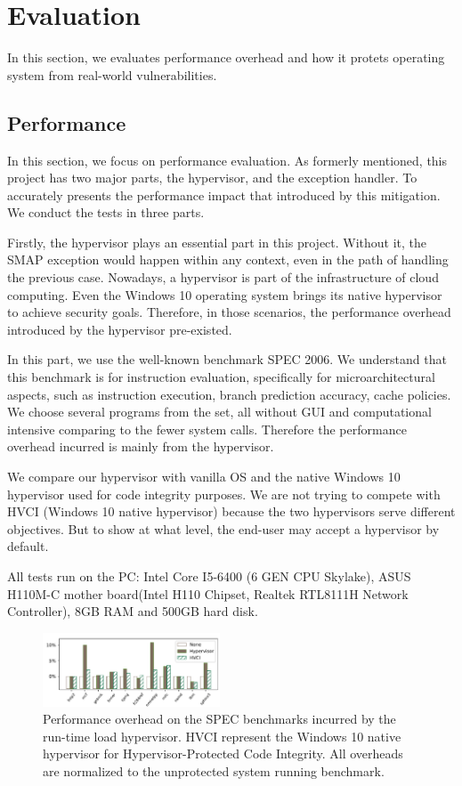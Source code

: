 
\section{Evaluation}
\label{sec:ktoctou-evaluation}

In this section, we evaluates performance overhead and how it protets  operating system from real-world vulnerabilities.

\subsection{Performance}
In this section, we focus on performance evaluation. 
As formerly mentioned, this project has two major parts, the hypervisor, and the exception handler. To accurately presents the performance impact that introduced by this mitigation. We conduct the tests in three parts.

Firstly, the hypervisor plays an essential part in this project. Without it, the SMAP exception would happen within any context, even in the path of handling the previous case. Nowadays, a hypervisor is part of the infrastructure of cloud computing. Even the Windows 10 operating system brings its native hypervisor to achieve security goals.  Therefore, in those scenarios,  the performance overhead introduced by the hypervisor pre-existed. 

In this part, we use the well-known benchmark SPEC 2006. We understand that this benchmark is for instruction evaluation, specifically for microarchitectural aspects, such as instruction execution, branch prediction accuracy, cache policies. We choose several programs from the set, all without GUI and computational intensive comparing to the fewer system calls. Therefore the performance overhead incurred is mainly from the hypervisor.

We compare our hypervisor with vanilla OS and the native Windows 10 hypervisor used for code integrity purposes. We are not trying to compete with HVCI (Windows 10 native hypervisor) because the two hypervisors serve different objectives. But to show at what level, the end-user may accept a hypervisor by default.


All tests run on the PC: Intel Core I5-6400 (6 GEN CPU Skylake), ASUS H110M-C mother board(Intel H110 Chipset, Realtek RTL8111H Network Controller), 8GB RAM and 500GB hard disk.


\begin{figure}[th]
  \includegraphics[width=0.47\textwidth]{figures/benchmark3}
  \centering
  \caption{Performance overhead on the SPEC benchmarks incurred by the run-time load hypervisor. HVCI represent the Windows 10 native hypervisor for Hypervisor-Protected Code Integrity. All overheads are normalized to the unprotected system running benchmark.}
  \label{fig:benchmark}
\end{figure}

